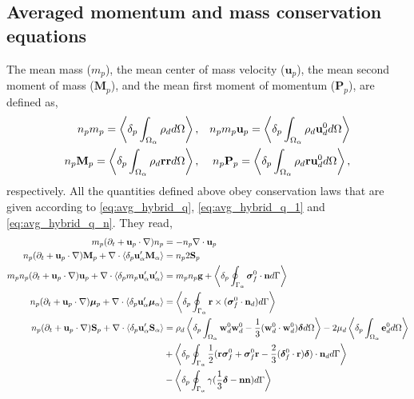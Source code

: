 \subsection{Averaged momentum and mass conservation equations}
The mean mass ($m_p$), the mean center of mass velocity ($\textbf{u}_p$), the mean second moment of mass ($\textbf{M}_p$), and the mean first moment of momentum ($\textbf{P}_p$), are defined as,
\begin{align}
    n_p m_p 
    =
    \left<\delta_{p} \int_{\Omega_{\alpha}} \rho_d d\Omega\right>,
    && n_p m_p \textbf{u}_p  
    =
    \left<\delta_{p} \int_{\Omega_{\alpha}} \rho_d \textbf{u}_d^0 d\Omega\right>\\
    n_p \textbf{M}_p  
    =
    \left<\delta_{p} \int_{\Omega_{\alpha}} \rho_d \textbf{rr}  d\Omega\right>,
    && n_p \textbf{P}_p  
    =
    \left<\delta_{p} \int_{\Omega_{\alpha}} \rho_d \textbf{r} \textbf{u}_d^0 d\Omega\right>,
\end{align} 
respectively.
All the quantities defined above obey conservation laws that are given according to \ref{eq:avg_hybrid_q}, \ref{eq:avg_hybrid_q_1} and \ref{eq:avg_hybrid_q_n}.
They read, 
\begin{align}
    m_p(\pddt + \textbf{u}_p \cdot \grad)n_p
    &=
    - n_p \div \textbf{u}_p\\
    n_p (\pddt + \textbf{u}_p \cdot \grad) \textbf{M}_p
    +\div  \pavg{\textbf{u}_\alpha'\textbf{M}_\alpha}
    &=
    n_p2  \textbf{S}_p
    \label{eq:dt_hybrid_Mp}\\
    \label{eq:dt_hybrid_up}
    m_p n_p(\pddt + \textbf{u}_p \cdot \grad)\textbf{u}_p
    + \div \pavg{m_p \textbf{u}_\alpha'\textbf{u}_\alpha'}
    &=
    m_p n_p \textbf{g}
    + \pSavg{\bm\sigma_f^0 \cdot \textbf{n}}\\
    \label{eq:dt_hybrid_mup}
    n_p (\pddt + \textbf{u}_p \cdot \grad) \bm{\mu}_p
    +\div  \pavg{\textbf{u}_\alpha'\bm\mu_\alpha}
    &=
    \pSavg{\textbf{r}\times(\bm\sigma_f^0\cdot \textbf{n}_d)}
    \\
    \label{eq:dt_hybrid_Sp}
    n_p (\pddt + \textbf{u}_p \cdot \grad) \textbf{S}_p
    +\div  \pavg{\textbf{u}_\alpha'\textbf{S}_\alpha}
    &=
    \rho_d \pOavg{
        \textbf{w}_d^0  \textbf{w}_d^0 
        -\frac{1}{3} (\textbf{w}_d^0 \cdot  \textbf{w}_d^0) \bm\delta
    }
    -2 \mu_d \pOavg{\textbf{e}_d^0} \nonumber \\
    &+\pSavg{\frac{1}{2}(\textbf{r}\bm\sigma_f^0+\bm\sigma_f^0\textbf{r}-\frac{2}{3}(\bm\delta_f^0 \cdot \textbf{r})\bm\delta)\cdot \textbf{n}_d}\nonumber\\
    &-  \pSavg{\gamma (\frac{1}{3}\bm\delta - \textbf{nn})}
\end{align}
